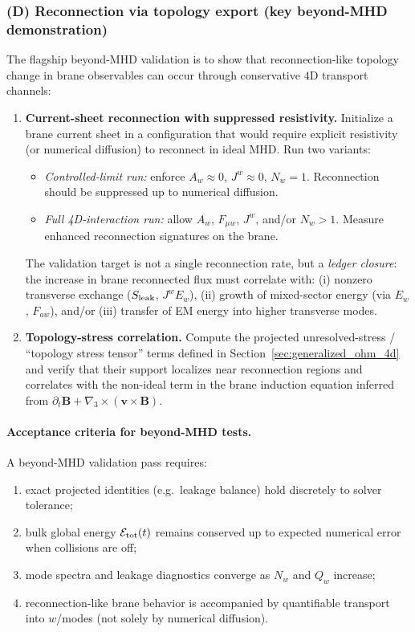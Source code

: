 \documentclass[11pt]{article}
\newcommand{\gradthree}{\nabla_3}
\newcommand{\B}{\mathbf{B}}
\newcommand{\Sleak}{S_{\rm leak}}
\begin{document}
\subsubsection*{(D) Reconnection via topology export (key beyond-MHD demonstration)}
The flagship beyond-MHD validation is to show that reconnection-like topology change
in brane observables can occur through conservative \(4\)D transport channels:
\begin{enumerate}[leftmargin=1.6em]
\item \textbf{Current-sheet reconnection with suppressed resistivity.}
Initialize a brane current sheet in a configuration that would require explicit
resistivity (or numerical diffusion) to reconnect in ideal MHD. Run two variants:
\begin{itemize}[leftmargin=1.7em]
\item \emph{Controlled-limit run:} enforce \(A_w\approx 0\), \(J^w\approx 0\),
\(N_w=1\). Reconnection should be suppressed up to numerical diffusion.
\item \emph{Full 4D-interaction run:} allow \(A_w\), \(F_{\mu w}\), \(J^w\), and/or
\(N_w>1\). Measure enhanced reconnection signatures on the brane.
\end{itemize}
The validation target is not a single reconnection rate, but a \emph{ledger closure}:
the increase in brane reconnected flux must correlate with:
(i) nonzero transverse exchange (\(\Sleak\), \(J^wE_w\)),
(ii) growth of mixed-sector energy (via \(E_w\), \(F_{aw}\)),
and/or (iii) transfer of EM energy into higher transverse modes.

\item \textbf{Topology-stress correlation.}
Compute the projected unresolved-stress / ``topology stress tensor'' terms defined
in Section~\ref{sec:generalized_ohm_4d} and verify that their support localizes near
reconnection regions and correlates with the non-ideal term in the brane induction
equation inferred from \(\partial_t\B+\gradthree\times(\mathbf{v}\times\B)\).
\end{enumerate}

\paragraph{Acceptance criteria for beyond-MHD tests.}
A beyond-MHD validation pass requires:
\begin{enumerate}[leftmargin=1.6em]
\item exact projected identities (e.g.\ leakage balance) hold discretely to solver tolerance;
\item bulk global energy \(\mathcal{E}_{\rm tot}(t)\) remains conserved up to expected
numerical error when collisions are off;
\item mode spectra and leakage diagnostics converge as \(N_w\) and \(Q_w\) increase;
\item reconnection-like brane behavior is accompanied by quantifiable transport into
\(w\)/modes (not solely by numerical diffusion).
\end{enumerate}
\end{document}
